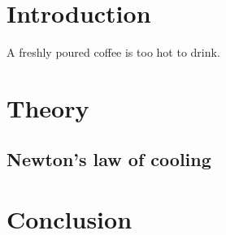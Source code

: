 \documentclass[a4paper,11pt]{article}
\begin{document}
\tableofcontents

\section{Introduction}
A freshly poured coffee is too hot to drink.

\section{Theory}
\subsection{Newton's law of cooling}

\section{Conclusion}
\end{document}
